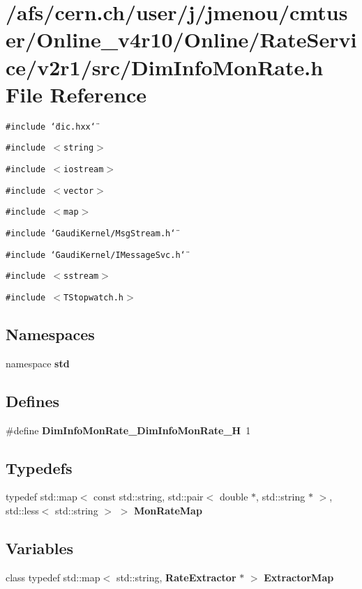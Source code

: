 \section{/afs/cern.ch/user/j/jmenou/cmtuser/Online\_\-v4r10/Online/Rate\-Service/v2r1/src/Dim\-Info\-Mon\-Rate.h File Reference}
\label{DimInfoMonRate_8h}
{\tt \#include \char`\"{}dic.hxx\char`\"{}}\par
{\tt \#include $<$string$>$}\par
{\tt \#include $<$iostream$>$}\par
{\tt \#include $<$vector$>$}\par
{\tt \#include $<$map$>$}\par
{\tt \#include \char`\"{}Gaudi\-Kernel/Msg\-Stream.h\char`\"{}}\par
{\tt \#include \char`\"{}Gaudi\-Kernel/IMessage\-Svc.h\char`\"{}}\par
{\tt \#include $<$sstream$>$}\par
{\tt \#include $<$TStopwatch.h$>$}\par
\subsection*{Namespaces}
\begin{CompactItemize}
\item 
namespace {\bf std}
\end{CompactItemize}
\subsection*{Defines}
\begin{CompactItemize}
\item 
\#define {\bf Dim\-Info\-Mon\-Rate\_\-Dim\-Info\-Mon\-Rate\_\-H}~1
\end{CompactItemize}
\subsection*{Typedefs}
\begin{CompactItemize}
\item 
typedef std::map$<$ const std::string, std::pair$<$ double $\ast$, std::string $\ast$ $>$, std::less$<$ std::string $>$ $>$ {\bf Mon\-Rate\-Map}
\end{CompactItemize}
\subsection*{Variables}
\begin{CompactItemize}
\item 
class typedef std::map$<$ std::string, {\bf Rate\-Extractor} $\ast$ $>$ {\bf Extractor\-Map}
\end{CompactItemize}


